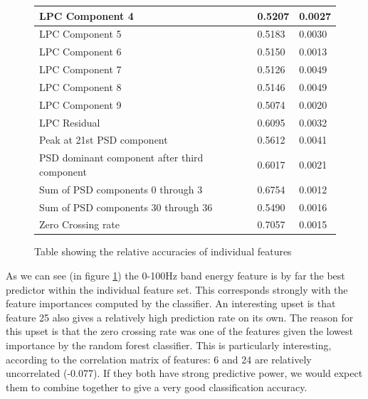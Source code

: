 \documentclass[ %
                    author={Sam Phippen},
                supervisor={Dr. Rafal Bogacz},
                     title={Real time voice activity detectors in noisy personal computing environments},
                  subtitle={},
                    degree={MEng},
                      year={2012} ]{thesis}
\begin{document}
\begin{figure}
\begin{center}
\begin{tabular}{|l|l|l|}
            LPC Component 4                               & 0.5207                         & 0.0027 \\ \hline
            LPC Component 5                               & 0.5183                         & 0.0030 \\ \hline
            LPC Component 6                               & 0.5150                         & 0.0013 \\ \hline
            LPC Component 7                               & 0.5126                         & 0.0049 \\ \hline
            LPC Component 8                               & 0.5146                         & 0.0049 \\ \hline
            LPC Component 9                               & 0.5074                         & 0.0020 \\ \hline
            LPC Residual                                  & 0.6095                         & 0.0032 \\ \hline
            Peak at 21st PSD component                    & 0.5612                         & 0.0041 \\ \hline
            PSD dominant component after third component  & 0.6017                         & 0.0021 \\ \hline
            Sum of PSD components 0 through 3             & 0.6754                         & 0.0012 \\ \hline
            Sum of PSD components 30 through 36           & 0.5490                         & 0.0016 \\ \hline
            Zero Crossing rate                            & 0.7057                         & 0.0015 \\ \hline
        \end{tabular}
    \end{center}
    \caption{Table showing the relative accuracies of individual features}
    \label{fig:feature-accuracies}
\end{figure}

As we can see (in figure \ref{fig:feature-accuracies}) the 0-100Hz band energy
feature is by far the best predictor within the individual feature set. This
corresponds strongly with the feature importances computed by the classifier.
An interesting upset is that feature 25 also gives a relatively high prediction
rate on its own. The reason for this upset is that the zero crossing rate was
one of the features given the lowest importance by the random forest
classifier. This is particularly interesting, according to the correlation
matrix of features: 6 and 24 are relatively uncorrelated (-0.077). If they
both have strong predictive power, we would expect them to combine together to
give a very good classification accuracy.
\end{document}
